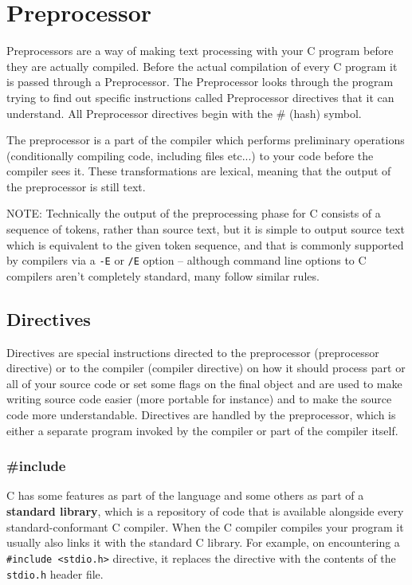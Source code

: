 \section{Preprocessor}
Preprocessors are a way of making text processing with your C program before
they are actually compiled. Before the actual compilation of every C program it
is passed through a Preprocessor. The Preprocessor looks through the program
trying to find out specific instructions called Preprocessor directives that it
can understand. All Preprocessor directives begin with the \# (hash) symbol.

The preprocessor is a part of the compiler which performs preliminary
operations (conditionally compiling code, including files etc...) to your code
before the compiler sees it. These transformations are lexical, meaning that
the output of the preprocessor is still text. 

NOTE: Technically the output of the preprocessing phase for C consists of a
sequence of tokens, rather than source text, but it is simple to output source
text which is equivalent to the given token sequence, and that is commonly
supported by compilers via a \texttt{-E} or \texttt{/E} option -- although
command line options to C compilers aren't completely standard, many follow
similar rules. 

\subsection{Directives}
Directives are special instructions directed to the preprocessor (preprocessor
directive) or to the compiler (compiler directive) on how it should process
part or all of your source code or set some flags on the final object and are
used to make writing source code easier (more portable for instance) and to
make the source code more understandable. Directives are handled by the
preprocessor, which is either a separate program invoked by the compiler or
part of the compiler itself.

\subsubsection{\#include}
C has some features as part of the language and some others as part of a
\textbf{standard library}, which is a repository of code that is available
alongside every standard-conformant C compiler. When the C compiler compiles
your program it usually also links it with the standard C library. For example,
on encountering a \texttt{\#include \textless{}stdio.h\textgreater{}}
directive, it replaces the directive with the contents of the \texttt{stdio.h}
header file.

